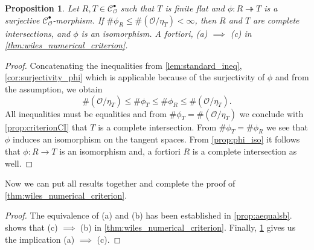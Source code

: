 \documentclass{article}
\theoremstyle{plain}%
\newtheorem{proposition}[theorem]{Proposition}
\theoremstyle{definition}
\theoremstyle{remark}
\newcommand{\cob}{\mathcal{C}_\mathcal{O}^\bullet}
\begin{document}
\begin{proposition}\cite[theorem 5.28]{Darmon1995}\label{prop:aimpliesc}
    Let \(R, T \in \cob\) such that \(T\) is finite flat and 
    \(\phi\colon R \twoheadrightarrow T\) is a surjective \(\cob\)-morphism.
    If \(\# \phi_R \leq \#(\mathcal{O}/\eta_T) < \infty\), then \(R\) and \(T\) are complete intersections,
    and \(\phi\) is an isomorphism.
    A fortiori, (a) \(\implies\) (c) in \cref{thm:wiles_numerical_criterion}.
\end{proposition}
\begin{proof}
    Concatenating the inequalities from \cref{lem:standard_ineq}, 
    \cref{cor:surjectivity_phi} which is applicable because of the surjectivity of \(\phi\)
    and from the assumption, we obtain
    \[
        \#(\mathcal{O}/\eta_T) \leq \#\phi_T \leq \#\phi_R \leq \#(\mathcal{O}/\eta_T).
    \]
    All inequalities must be equalities and from \(\#\phi_T = \#(\mathcal{O}/\eta_T)\)
    we conclude with \cref{prop:criterionCI} that \(T\) is a complete intersection.
    From \(\#\phi_T = \#\phi_R \) we see that \(\phi\) induces an isomorphism on the tangent spaces.
    From \cref{prop:phi_iso} it follows that \(\phi\colon R \to T\) is an isomorphism and, 
    a fortiori \(R\) is a complete intersection as well.
\end{proof}

Now we can put all results together and complete the proof of \cref{thm:wiles_numerical_criterion}.
\begin{proof}
    The equivalence of (a) and (b) has been established in \cref{prop:aequalsb}.
     shows that (c) \(\implies\) (b) in \cref{thm:wiles_numerical_criterion}.
    Finally, \cref{prop:aimpliesc} gives us the implication (a) \(\implies\) (c).
\end{proof}

\newpage
\printbibliography
\end{document}
